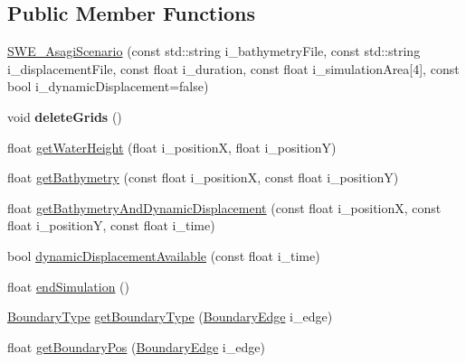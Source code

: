 \subsection*{Public Member Functions}
\begin{DoxyCompactItemize}
\item 
\hyperlink{classSWE__AsagiScenario_a9add0345b6793da297a44598451074e1}{S\-W\-E\-\_\-\-Asagi\-Scenario} (const std\-::string i\-\_\-bathymetry\-File, const std\-::string i\-\_\-displacement\-File, const float i\-\_\-duration, const float i\-\_\-simulation\-Area\mbox{[}4\mbox{]}, const bool i\-\_\-dynamic\-Displacement=false)
\item 
\hypertarget{classSWE__AsagiScenario_a48d6ba2326cbc06df693990cf41144e6}{void {\bfseries delete\-Grids} ()}\label{classSWE__AsagiScenario_a48d6ba2326cbc06df693990cf41144e6}

\item 
float \hyperlink{classSWE__AsagiScenario_a3d2772883dc584cb1c8ffaafa4dafb8f}{get\-Water\-Height} (float i\-\_\-position\-X, float i\-\_\-position\-Y)
\item 
float \hyperlink{classSWE__AsagiScenario_a95456b79bd1f96120bd8efa73d927568}{get\-Bathymetry} (const float i\-\_\-position\-X, const float i\-\_\-position\-Y)
\item 
float \hyperlink{classSWE__AsagiScenario_a462a4df01aec18b2e5af37f42e86cfde}{get\-Bathymetry\-And\-Dynamic\-Displacement} (const float i\-\_\-position\-X, const float i\-\_\-position\-Y, const float i\-\_\-time)
\item 
bool \hyperlink{classSWE__AsagiScenario_ada067ab5b456f445c66b9fe84c3a4ca5}{dynamic\-Displacement\-Available} (const float i\-\_\-time)
\item 
float \hyperlink{classSWE__AsagiScenario_a44449cbcfad023f60ae2af020576fe4b}{end\-Simulation} ()
\item 
\hyperlink{SWE__Scenario_8hh_af75d5dd7322fa39ed0af4e7839e600f8}{Boundary\-Type} \hyperlink{classSWE__AsagiScenario_adf7992278300b2cb2475398245bad877}{get\-Boundary\-Type} (\hyperlink{SWE__Scenario_8hh_aa5e01e3f7df312f7b9b0d02521141fcc}{Boundary\-Edge} i\-\_\-edge)
\item 
float \hyperlink{classSWE__AsagiScenario_a1f35638db4394f05fa2d0669634aa9ca}{get\-Boundary\-Pos} (\hyperlink{SWE__Scenario_8hh_aa5e01e3f7df312f7b9b0d02521141fcc}{Boundary\-Edge} i\-\_\-edge)
\end{DoxyCompactItemize}


